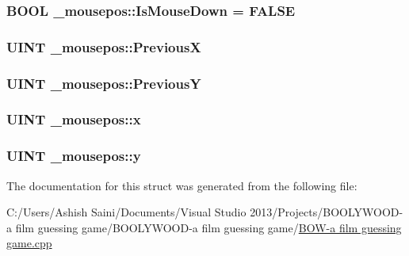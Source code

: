 \subsubsection[{Is\+Mouse\+Down}]{\setlength{\rightskip}{0pt plus 5cm}B\+O\+O\+L \+\_\+mousepos\+::\+Is\+Mouse\+Down = F\+A\+L\+S\+E}\label{struct__mousepos_a367af11c4d4e4776d55ba54412162ba5}
\hypertarget{struct__mousepos_a8f9021f7beef9b25242f39e602e71257}{}
\subsubsection[{Previous\+X}]{\setlength{\rightskip}{0pt plus 5cm}U\+I\+N\+T \+\_\+mousepos\+::\+Previous\+X}\label{struct__mousepos_a8f9021f7beef9b25242f39e602e71257}
\hypertarget{struct__mousepos_a1dc599d3383f2062ecb0a8f5ddfc0449}{}
\subsubsection[{Previous\+Y}]{\setlength{\rightskip}{0pt plus 5cm}U\+I\+N\+T \+\_\+mousepos\+::\+Previous\+Y}\label{struct__mousepos_a1dc599d3383f2062ecb0a8f5ddfc0449}
\hypertarget{struct__mousepos_a49dba96a4968f24e0096f5bda7bd7799}{}
\subsubsection[{x}]{\setlength{\rightskip}{0pt plus 5cm}U\+I\+N\+T \+\_\+mousepos\+::x}\label{struct__mousepos_a49dba96a4968f24e0096f5bda7bd7799}
\hypertarget{struct__mousepos_a97dc4bc172c95859002071bdef22f69f}{}
\subsubsection[{y}]{\setlength{\rightskip}{0pt plus 5cm}U\+I\+N\+T \+\_\+mousepos\+::y}\label{struct__mousepos_a97dc4bc172c95859002071bdef22f69f}


The documentation for this struct was generated from the following file\+:\begin{DoxyCompactItemize}
\item 
C\+:/\+Users/\+Ashish Saini/\+Documents/\+Visual Studio 2013/\+Projects/\+B\+O\+O\+L\+Y\+W\+O\+O\+D-\/a film guessing game/\+B\+O\+O\+L\+Y\+W\+O\+O\+D-\/a film guessing game/\hyperlink{_b_o_w-a_01film_01guessing_01game_8cpp}{B\+O\+W-\/a film guessing game.\+cpp}\end{DoxyCompactItemize}
